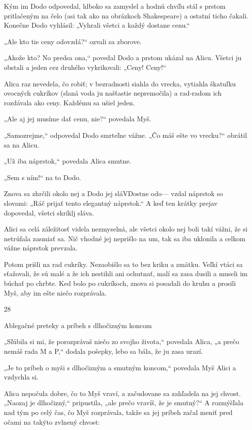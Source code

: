 \documentclass[12pt]{book}
\begin{document}
\begin{Parallel}[p]{}{}
{Kým im Dodo odpovedal, hlboko sa zamyslel a hodnú
chvíľu stál s prstom pritlačeným na čelo (asi tak ako na
obrázkoch Shakespeare) a ostatní ticho čakali. Konečne
Dodo vyhlásil: „Vyhrali všetci a každý dostane cenu.“

„Ale kto tie ceny odovzdá?“ ozvali sa zborove.

„Akože kto? No predsa ona,“ povedal Dodo a prstom
ukázal na Alicu. Všetci ju obstali a jeden cez druhého
vykrikovali: „Ceny! Ceny!“

Alica raz nevedela, čo robiť; v bezradnosti siahla do
vrecka, vytiahla škatuľku ovocných cukríkov (slaná voda ju
našťastie nepremočila) a rad-radom ich rozdávala ako ceny.
Každému sa ušiel jeden.

„Ale aj jej musíme dať cenu, nie?“ povedala Myš.

„Samozrejme,“ odpovedal Dodo smrteľne vážne. „Čo
máš ešte vo vrecku?“ obrátil sa na Alicu.

„Už iba náprstok,“ povedala Alica smutne.

„Sem s ním!“ na to Dodo.

Znova sa zhrčili okolo nej a Dodo jej sláVDostne odo—
vzdal náprstok so slovami: „Ráč prijať tento elegantný
náprstok.“ A keď ten krátky prejav dopovedal, všetci
skríklj sláva.

Alici sa celá záležitosť videla nezmyselná, ale všetci okolo
nej boli takí vážni, že si netrúfala zasmiať sa. Nič vhodné jej
neprišlo na um, tak sa iba uklonila a celkom vážne náprstok
prevzala.

Potom prišli na rad cukríky. Nezaobišlo sa to bez kriku
a zmätku. Veľkí vtáci sa sťažovali, že sú malé a že ich nestihli
ani ochutnať, malí sa zasa dusili a museli im búchať po
chrbte. Ked bolo po cukríkoch, znova si posadali do kruhu
a prosili Myš, aby im ešte niečo rozprávala.

28

Ablegačné preteky a príbeh s dlhočizným koncom

„Sľúbila si mi, že porozprávaš niečo zo svojho života,“
povedala Alica, „a prečo nemáš rada M a P,“ dodala
pošepky, lebo sa bála, že ju zasa urazí.

„Je to príbeh o myši s dlhočizným a smutným koncom,“
povedala Myš Alici a vzdychla si.

Alica nepočula dobre, čo to Myš vraví, a začudovane sa
zahľadela na jej chvost. „Naozaj je dlhočizný,“ pripustila,
„ale prečo vravíš, že je smutný?“ A rozmýšľala nad tým po
celý čas, čo Myš rozprávala, takže sa jej príbeh začal meniť
pred očami na takýto zvlnený chvost:

}
\end{Parallel}
\end{document}
